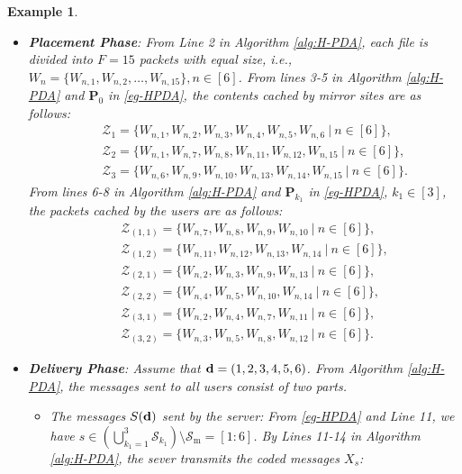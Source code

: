 \documentclass[onecolumn,10pt]{IEEEtran}
\theoremstyle{mythm}
\newtheorem{example}{Example}
\begin{document}
\begin{example}
\begin{itemize}
	\item \textbf{Placement Phase}: From Line 2 in Algorithm \ref{alg:H-PDA}, each file is divided into $F=15$ packets with equal size, i.e., $W_{n}=\{W_{n,1}, W_{n,2}, \ldots, W_{n,15}\}, n\in [6]$. From lines 3-5 in Algorithm \ref{alg:H-PDA} and $\mathbf{P}_0$ in \eqref{eg-HPDA}, the contents cached by mirror sites are as follows:
\begin{eqnarray*}
&&\mathcal{Z}_{1} =\{W_{n,1}, W_{n,2}, W_{n,3}, W_{n,4}, W_{n,5}, W_{n,6}\ |\ n\in[6]\},\\
&&\mathcal{Z}_{2} =\{W_{n,1}, W_{n,7}, W_{n,8}, W_{n,11}, W_{n,12}, W_{n,15}\ |\ n\in[6]\},\\
&&\mathcal{Z}_{3} =\{W_{n,6}, W_{n,9}, W_{n,10}, W_{n,13}, W_{n,14}, W_{n,15}\ |\ n\in[6]\}.
\end{eqnarray*}From lines 6-8 in Algorithm \ref{alg:H-PDA} and $\mathbf{P}_{k_1}$ in \eqref{eg-HPDA}, $k_1\in[3]$, the packets cached by the users are as follows:
\begin{eqnarray*}
&&\mathcal{Z}_{(1,1)} =\{W_{n,7}, W_{n,8}, W_{n,9}, W_{n,10}\ |\  n\in[6]\},\\
&&\mathcal{Z}_{(1,2)} =\{W_{n,11}, W_{n,12}, W_{n,13}, W_{n,14}\ |\  n\in[6]\},\\
&&\mathcal{Z}_{(2,1)} =\{W_{n,2}, W_{n,3}, W_{n,9}, W_{n,13}\ |\  n\in[6]\},\\
&&\mathcal{Z}_{(2,2)} =\{W_{n,4}, W_{n,5}, W_{n,10}, W_{n,14}\ |\  n\in[6]\},\\
&&\mathcal{Z}_{(3,1)} =\{W_{n,2}, W_{n,4}, W_{n,7}, W_{n,11}\ |\  n\in[6]\},\\
&&\mathcal{Z}_{(3,2)} =\{W_{n,3}, W_{n,5}, W_{n,8}, W_{n,12}\ |\  n\in[6]\}.
\end{eqnarray*}	
\item\textbf{Delivery Phase}: Assume that ${\bf d}=(1,2,3,4,5,6)$. From Algorithm \ref{alg:H-PDA}, the messages sent to all users consist of two parts.
\begin{itemize}
\item The messages $S({\bf d})$ sent by the server: From \eqref{eg-HPDA} and Line 11, we have $s\in\left(\bigcup_{k_1=1}^{3}\mathcal{S}_{k_1}\right)\setminus\mathcal{S}_\text{m}=[1:6]$. By Lines 11-14 in Algorithm \ref{alg:H-PDA}, the sever transmits the coded messages $X_{s}$:
\begin{equation*}
	\begin{split}

\end{split}
\end{equation*}
\end{itemize}
\end{itemize}
\end{example}
\end{document}
